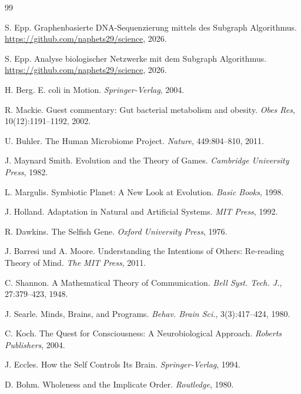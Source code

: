 \documentclass[a4paper,12pt]{article}
\theoremstyle{definition}
\begin{document}
\begin{thebibliography}{99}

    S. Epp.
    Graphenbasierte DNA-Sequenzierung mittels des Subgraph Algorithmus.
    \url{https://github.com/naphets29/science}, 2026.

    S. Epp.
    Analyse biologischer Netzwerke mit dem Subgraph Algorithmus.
    \url{https://github.com/naphets29/science}, 2026.

    H. Berg.
    E. coli in Motion.
    \textit{Springer-Verlag}, 2004.

    R. Mackie.
    Guest commentary: Gut bacterial metabolism and obesity.
    \textit{Obes Res}, 10(12):1191--1192, 2002.

    U. Buhler.
    The Human Microbiome Project.
    \textit{Nature}, 449:804--810, 2011.

    J. Maynard Smith.
    Evolution and the Theory of Games.
    \textit{Cambridge University Press}, 1982.

    L. Margulis.
    Symbiotic Planet: A New Look at Evolution.
    \textit{Basic Books}, 1998.

    J. Holland.
    Adaptation in Natural and Artificial Systems.
    \textit{MIT Press}, 1992.

    R. Dawkins.
    The Selfish Gene.
    \textit{Oxford University Press}, 1976.

    J. Barresi und A. Moore.
    Understanding the Intentions of Others: Re-reading Theory of Mind.
    \textit{The MIT Press}, 2011.

    C. Shannon.
    A Mathematical Theory of Communication.
    \textit{Bell Syst. Tech. J.}, 27:379--423, 1948.

    J. Searle.
    Minds, Brains, and Programs.
    \textit{Behav. Brain Sci.}, 3(3):417--424, 1980.

    C. Koch.
    The Quest for Consciousness: A Neurobiological Approach.
    \textit{Roberts Publishers}, 2004.

    J. Eccles.
    How the Self Controls Its Brain.
    \textit{Springer-Verlag}, 1994.

    D. Bohm.
    Wholeness and the Implicate Order.
    \textit{Routledge}, 1980.


\end{thebibliography}
\end{document}
